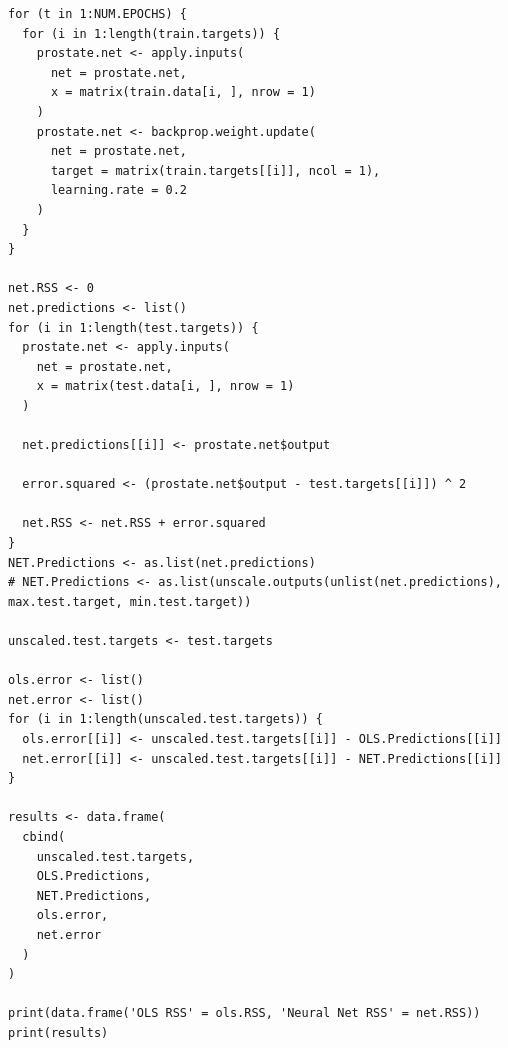 \documentclass{article}
\begin{document}
\begin{verbatim}
for (t in 1:NUM.EPOCHS) {
  for (i in 1:length(train.targets)) {
    prostate.net <- apply.inputs(
      net = prostate.net,
      x = matrix(train.data[i, ], nrow = 1)
    )
    prostate.net <- backprop.weight.update(
      net = prostate.net,
      target = matrix(train.targets[[i]], ncol = 1),
      learning.rate = 0.2
    )
  }
}

net.RSS <- 0
net.predictions <- list()
for (i in 1:length(test.targets)) {
  prostate.net <- apply.inputs(
    net = prostate.net,
    x = matrix(test.data[i, ], nrow = 1)
  )

  net.predictions[[i]] <- prostate.net$output

  error.squared <- (prostate.net$output - test.targets[[i]]) ^ 2

  net.RSS <- net.RSS + error.squared
}
NET.Predictions <- as.list(net.predictions)
# NET.Predictions <- as.list(unscale.outputs(unlist(net.predictions), max.test.target, min.test.target))

unscaled.test.targets <- test.targets

ols.error <- list()
net.error <- list()
for (i in 1:length(unscaled.test.targets)) {
  ols.error[[i]] <- unscaled.test.targets[[i]] - OLS.Predictions[[i]]
  net.error[[i]] <- unscaled.test.targets[[i]] - NET.Predictions[[i]]
}

results <- data.frame(
  cbind(
    unscaled.test.targets,
    OLS.Predictions,
    NET.Predictions,
    ols.error,
    net.error
  )
)

print(data.frame('OLS RSS' = ols.RSS, 'Neural Net RSS' = net.RSS))
print(results)
\end{verbatim}
\end{document}
